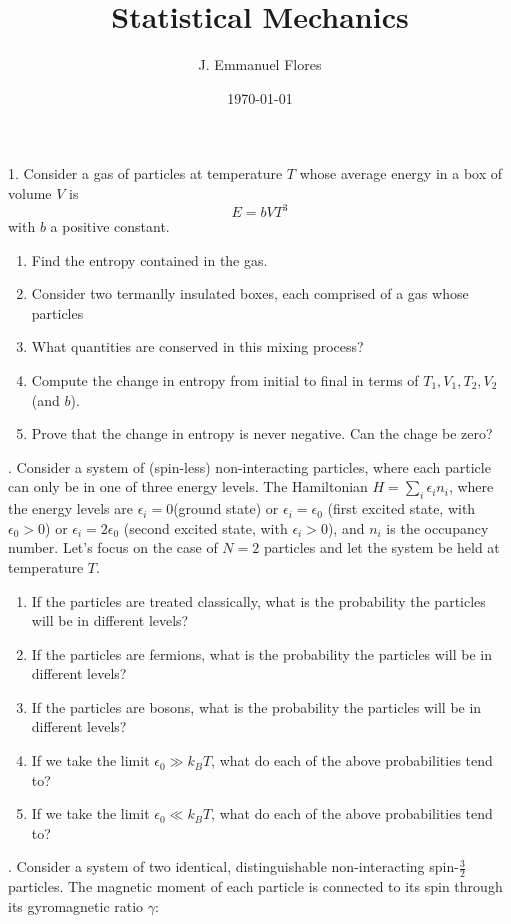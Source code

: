 \documentclass[11pt]{article}
\title{Statistical Mechanics}
\author{J. Emmanuel Flores}
\date{\today}
\begin{document}
\maketitle

1. Consider a gas of particles at temperature $T$ whose average energy in a box of volume $V$ is
\begin{displaymath}
  E = bVT^3
\end{displaymath}
with $b$ a positive constant.
\begin{enumerate}
	\item Find the entropy contained in the gas.
	\item Consider two termanlly insulated boxes, each comprised of a gas whose particles 
	\item What quantities are conserved in this mixing process?
	\item Compute the change in  entropy from initial to final in terms of $T_1, V_1, T_2, V_2$ (and $b$).
	\item Prove that the change in entropy is never negative. Can the chage be zero?
\end{enumerate}
. Consider a system of (spin-less) non-interacting particles, where each particle can only be  in one of three energy levels. The Hamiltonian $H=\sum_i \epsilon_i n_i$, where the energy levels are $\epsilon_i=0$(ground state) or $\epsilon_i=\epsilon_0$ (first excited state, with $\epsilon_0>0$) or $\epsilon_i=2\epsilon_0$ (second excited state, with $\epsilon_i>0$), and $n_i$ is the occupancy number.
Let's focus on the case of $N=2$ particles and let the system be held at temperature $T$.
\begin{enumerate}
	\item If the particles are treated classically, what is the probability the particles will be in different levels?
	\item If the particles are fermions, what is the probability the particles will be in different levels?
	\item If the particles are bosons, what is the probability the particles will be in different levels?
	\item If we take the limit $\epsilon_0\gg k_B T$, what do each of the above probabilities tend to?
	\item If we take the limit $\epsilon_0\ll k_B T$, what do each of the above probabilities tend to?
\end{enumerate}
. Consider a system of two identical, distinguishable non-interacting spin-$\frac{3}{2}$ particles. The magnetic moment of each particle is connected to its spin through its gyromagnetic ratio $\gamma$:
\end{document}
